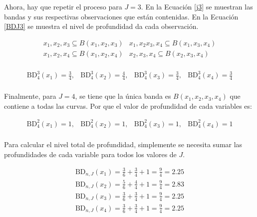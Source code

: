 \begin{ejemplo}
Ahora, hay que repetir el proceso para $J = 3$. En la Ecuación \eqref{j3} se muestran las bandas y sus respectivas observaciones que están contenidas. En la Ecuación \eqref{BDJ3} se muestra el nivel de profundidad da cada observación.

\begin{equation}\label{j3}
    \begin{matrix}
        x_1, x_2, x_3 \subseteq B(x_1, x_2, x_3) & x_1, x_2 x_3, x_4 \subseteq B(x_1, x_3, x_4) \\
        x_1, x_2, x_4 \subseteq B(x_1, x_2, x_4) & x_2, x_3, x_4 \subseteq B(x_2, x_3, x_4) \\
    \end{matrix}
\end{equation}

\begin{equation}\label{BDJ3}
    \begin{matrix}
        \mathrm{BD}^{3}_4(x_1) = \frac{3}{4}, & \mathrm{BD}^{3}_4(x_2) = \frac{4}{4},  & \mathrm{BD}^{3}_4(x_3) = \frac{3}{4},  & \mathrm{BD}^{3}_4(x_4) = \frac{3}{4} \\
    \end{matrix} 
\end{equation}

Finalmente, para $J = 4$, se tiene que la única banda es $B(x_1, x_2, x_3, x_4)$ que contiene a todas las curvas. Por que el valor de profundidad de cada variables es:

\begin{equation}
    \begin{matrix}
            \mathrm{BD}^{2}_4(x_1) = 1, & \mathrm{BD}^{2}_4 (x_2) = 1,  & \mathrm{BD}^{2}_4(x_3) = 1,  & \mathrm{BD}^{2}_4(x_4) = 1 \\
        \end{matrix}    
\end{equation}

Para calcular el nivel total de profundidad, simplemente se necesita sumar las profundidades de cada variable para todos los valores de $J$.

\begin{equation}
    \begin{matrix}
\mathrm{BD}_{n, J}(x_1) = \frac{3}{6} + \frac{3}{4} + 1 = \frac{9}{4} = 2.25 \\
\mathrm{BD}_{n, J}(x_2) = \frac{5}{6} + \frac{4}{4} + 1 = \frac{9}{4} = 2.83 \\
\mathrm{BD}_{n, J}(x_3) = \frac{3}{6} + \frac{3}{4} + 1 = \frac{9}{4} = 2.25 \\
\mathrm{BD}_{n, J}(x_4) = \frac{3}{6} + \frac{3}{4} + 1 = \frac{9}{4} = 2.25
\end{matrix}
\end{equation}
\end{ejemplo}

